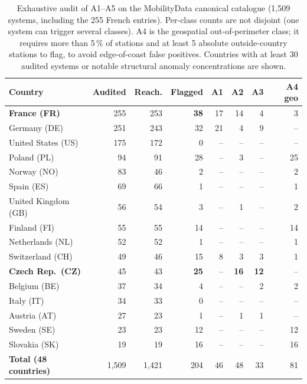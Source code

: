 \documentclass[11pt,a4paper]{article}
\begin{document}
\begin{table}[ht]
\centering
\caption{Exhaustive audit of A1--A5 on the MobilityData canonical
catalogue (1{,}509 systems, including the 255 French entries).
Per-class counts are not disjoint (one system can trigger several
classes). A4 is the geospatial out-of-perimeter class; it requires
more than 5\,\% of stations and at least 5 absolute outside-country
stations to flag, to avoid edge-of-coast false positives. Countries
with at least 30 audited systems or notable structural anomaly
concentrations are shown.}
\label{tab:global-audit}
\small
\begin{tabular}{@{}lrrrrrrr@{}}
\toprule
\textbf{Country} & \textbf{Audited} & \textbf{Reach.} & \textbf{Flagged}
   & \textbf{A1} & \textbf{A2} & \textbf{A3} & \textbf{A4 geo}\\
\midrule
\textbf{France (FR)}      & 255 & 253 & \textbf{38} & 17 & 14 &  4 &  3 \\
Germany (DE)              & 251 & 243 & 32 & 21 &  4 &  9 & -- \\
United States (US)        & 175 & 172 &  0 & -- & -- & -- & -- \\
Poland (PL)               &  94 &  91 & 28 & -- &  3 & -- & 25 \\
Norway (NO)               &  83 &  46 &  2 & -- & -- & -- &  2 \\
Spain (ES)                &  69 &  66 &  1 & -- & -- & -- &  1 \\
United Kingdom (GB)       &  56 &  54 &  3 & -- &  1 & -- &  2 \\
Finland (FI)              &  55 &  55 & 14 & -- & -- & -- & 14 \\
Netherlands (NL)          &  52 &  52 &  1 & -- & -- & -- &  1 \\
Switzerland (CH)          &  49 &  46 & 15 &  8 &  3 &  3 &  1 \\
\textbf{Czech Rep.\ (CZ)} &  45 &  43 & \textbf{25} & -- & \textbf{16} & \textbf{12} & -- \\
Belgium (BE)              &  37 &  34 &  4 & -- & -- &  2 &  2 \\
Italy (IT)                &  34 &  33 &  0 & -- & -- & -- & -- \\
Austria (AT)              &  27 &  23 &  1 & -- &  1 &  1 & -- \\
Sweden (SE)               &  23 &  23 & 12 & -- & -- & -- & 12 \\
Slovakia (SK)             &  19 &  19 & 16 & -- & -- & -- & 16 \\
\midrule
\textbf{Total (48 countries)} & 1{,}509 & 1{,}421 & 204 & 46 & 48 & 33 & 81 \\
\bottomrule
\end{tabular}
\end{table}
\end{document}

